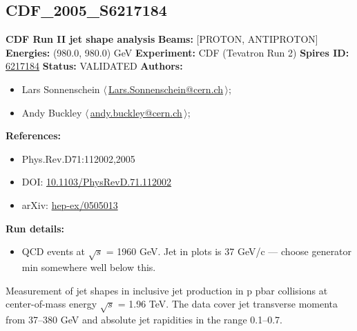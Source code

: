 \clearpage

\subsection[CDF\_2005\_S6217184]{CDF\_2005\_S6217184\,\cite{Acosta:2005ix}}
\textbf{CDF Run II jet shape analysis}\newline
\textbf{Beams:} [PROTON, ANTIPROTON] \newline
\textbf{Energies:} (980.0, 980.0) GeV \newline
\textbf{Experiment:} CDF (Tevatron Run 2) \newline
\textbf{Spires ID:} \href{http://www.slac.stanford.edu/spires/find/hep/www?rawcmd=key+6217184}{6217184}\newline
\textbf{Status:} VALIDATED\newline
\textbf{Authors:}
\begin{itemize}
  \item Lars Sonnenschein $\langle\,$\href{mailto:Lars.Sonnenschein@cern.ch}{Lars.Sonnenschein@cern.ch}$\,\rangle$;
  \item Andy Buckley $\langle\,$\href{mailto:andy.buckley@cern.ch}{andy.buckley@cern.ch}$\,\rangle$;
\end{itemize}
\textbf{References:}
\begin{itemize}
  \item Phys.Rev.D71:112002,2005
  \item DOI: \href{http://dx.doi.org/10.1103/PhysRevD.71.112002}{10.1103/PhysRevD.71.112002}
  \item arXiv: \href{http://arxiv.org/abs/hep-ex/0505013}{hep-ex/0505013}
\end{itemize}
\textbf{Run details:}
\begin{itemize}

  \item QCD events at \ensuremath{\sqrt{s}} = 1960 GeV. Jet \pTmin in plots is 37 GeV/c --- choose generator min \pT somewhere well below this.\end{itemize}

\noindent Measurement of jet shapes in inclusive jet production in p pbar collisions at center-of-mass energy \ensuremath{\sqrt{s}} = 1.96 TeV. The data cover jet transverse momenta from 37--380 GeV and absolute jet rapidities in the range 0.1--0.7.

\clearpage


\clearpage


